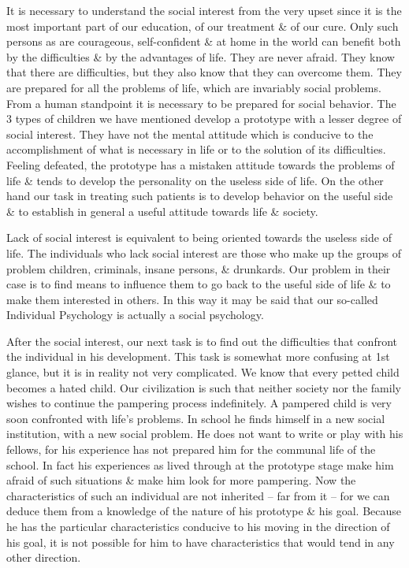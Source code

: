 \documentclass{article}
\numberwithin{equation}{section}
\begin{document}
It is necessary to understand the social interest from the very upset since it is the most important part of our education, of our treatment \& of our cure. Only such persons as are courageous, self-confident \& at home in the world can benefit both by the difficulties \& by the advantages of life. They are never afraid. They know that there are difficulties, but they also know that they can overcome them. They are prepared for all the problems of life, which are invariably social problems. From a human standpoint it is necessary to be prepared for social behavior. The 3 types of children we have mentioned develop a prototype with a lesser degree of social interest. They have not the mental attitude which is conducive to the accomplishment of what is necessary in life or to the solution of its difficulties. Feeling defeated, the prototype has a mistaken attitude towards the problems of life \& tends to develop the personality on the useless side of life. On the other hand our task in treating such patients is to develop behavior on the useful side \& to establish in general a useful attitude towards life \& society.

Lack of social interest is equivalent to being oriented towards the useless side of life. The individuals who lack social interest are those who make up the groups of problem children, criminals, insane persons, \& drunkards. Our problem in their case is to find means to influence them to go back to the useful side of life \& to make them interested in others. In this way it may be said that our so-called Individual Psychology is actually a social psychology.

After the social interest, our next task is to find out the difficulties that confront the individual in his development. This task is somewhat more confusing at 1st glance, but it is in reality not very complicated. We know that every petted child becomes a hated child. Our civilization is such that neither society nor the family wishes to continue the pampering process indefinitely. A pampered child is very soon confronted with life's problems. In school he finds himself in a new social institution, with a new social problem. He does not want to write or play with his fellows, for his experience has not prepared him for the communal life of the school. In fact his experiences as lived through at the prototype stage make him afraid of such situations \& make him look for more pampering. Now the characteristics of such an individual are not inherited -- far from it -- for we can deduce them from a knowledge of the nature of his prototype \& his goal. Because he has the particular characteristics conducive to his moving in the direction of his goal, it is not possible for him to have characteristics that would tend in any other direction.
\end{document}
